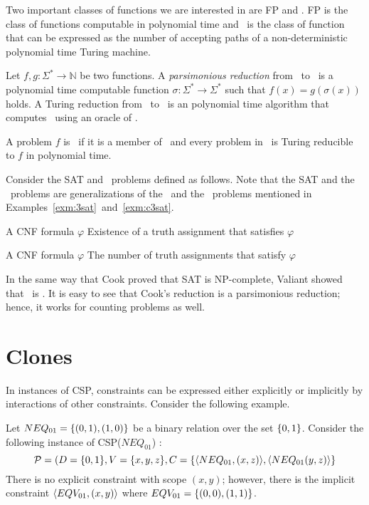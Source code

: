 Two important classes of functions we are interested in are FP and \cp\@.
FP is the class of functions computable in polynomial time and \cp\ is
the class of function that can be expressed as the
number of accepting paths of a non-deterministic polynomial time Turing machine. 

Let \(f,g:\Sigma^*\to\mathbb{N}\) be two functions. A \emph{parsimonious reduction}
from \mf\ to \mg\ is a polynomial time computable function
\(\sigma:\Sigma^*\to\Sigma^*\) such that
\(f(x)=g(\sigma(x))\) holds. 
A Turing reduction from \mf\ to \mg\ is an polynomial time algorithm
that computes \mf\ using an oracle of \mg\@.

\begin{defi} 
A problem \(f\) is \cpc\ if it is a member of \cp\ and every problem in \cp\ is 
Turing reducible to \(f\) in polynomial time.
\end{defi}

Consider the SAT and \csat\ problems defined as follows.
Note that the SAT and the \csat\ problems are generalizations of the \tsat\ and
the \ctsat\ problems
mentioned in Examples~\ref{exm:3sat}~and~\ref{exm:c3sat}\@. 

{A CNF formula \(\varphi\)}
{Existence of a truth assignment that satisfies \(\varphi\)}

\pdef{\csat}
{A CNF formula \(\varphi\)}
{The number of truth assignments that satisfy \(\varphi\)}

In the same way that Cook \cite{cook1971} proved that SAT is NP-complete,
Valiant \cite{Valiant1979} showed that \csat\ is \cpc\@. It is easy to see that 
Cook's reduction is a parsimonious reduction; hence, it works for counting problems
as well. 

\section{Clones}
In instances of CSP, constraints can be expressed either explicitly or implicitly by 
interactions of other constraints. Consider the following example.

\begin{example}
Let \(NEQ_{01}=\{{(0,1),(1,0)}\}\) be a binary relation over the set
\(\{{0,1}\}\)\@. Consider the following instance of 
CSP(\(NEQ_{01}\)) :
\[\mathcal{P}=(D=\{{0,1}\},V=\{{x,y,z}\},
 C=\{{\langle NEQ_{01},(x,z) \rangle,\langle NEQ_{01}(y,z) \rangle}\}\]
There is no explicit constraint with scope \((x,y)\)\@; however, there is the implicit 
constraint \(\langle EQV_{01},(x,y) \rangle\) where \(EQV_{01}=\{{(0,0),(1,1)}\}\)\@.
\end{example}

